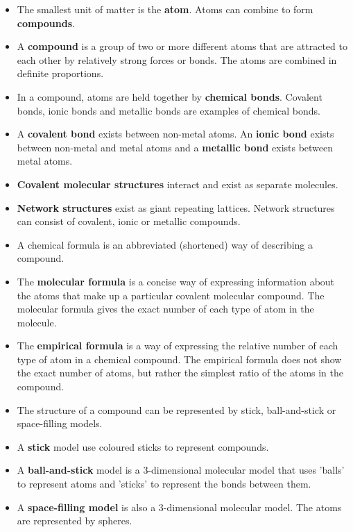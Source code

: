 \begin{itemize}[noitemsep]
\item The smallest unit of matter is the \textbf{atom}. Atoms can combine to form \textbf{compounds}.
\item A \textbf{compound} is a group of two or more different atoms that are attracted to each other by relatively strong forces or bonds. The atoms are combined in definite proportions.
\item In a compound, atoms are held together by \textbf{chemical bonds}. Covalent bonds, ionic bonds and metallic bonds are examples of chemical bonds.
\item A \textbf{covalent bond} exists between non-metal atoms. An \textbf{ionic bond} exists between non-metal and metal atoms and a \textbf{metallic bond} exists between metal atoms.
\item \textbf{Covalent molecular structures} interact and exist as separate molecules.
\item \textbf{Network structures} exist as giant repeating lattices. Network structures can consist of covalent, ionic or metallic compounds. 
\item A chemical formula is an abbreviated (shortened) way of describing a compound.
\item The \textbf{molecular formula} is a concise way of expressing information about the atoms that make up a particular covalent molecular compound. The molecular formula gives the exact number of each type of atom in the molecule.
\item The \textbf{empirical formula} is a way of expressing the relative number of each type of atom in a chemical compound. The empirical formula does not show the exact number of atoms, but rather the simplest ratio of the atoms in the compound.
\item The structure of a compound can be represented by stick, ball-and-stick or space-filling models.
\item A \textbf{stick} model use coloured sticks to represent compounds.
\item A \textbf{ball-and-stick} model is a 3-dimensional molecular model that uses 'balls' to represent atoms and 'sticks' to represent the bonds between them.
\item A \textbf{space-filling model} is also a 3-dimensional molecular model. The atoms are represented by spheres.
\end{itemize}
\label{m38120*secfhsst!!!underscore!!!id497}
